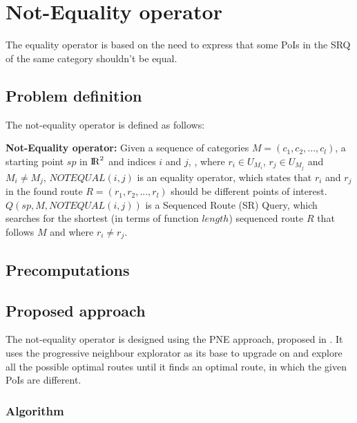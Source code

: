 \section{Not-Equality operator}
The equality operator is based on the need to express that some PoIs in the SRQ of the same category shouldn't be equal.

\subsection{Problem definition} 
\label{sec:problem}
The not-equality operator is defined as follows: \newline

\textbf{Not-Equality operator:} Given a sequence of categories $M = (c_1, c_2, ..., c_l)$, a starting point $sp$ in ${\rm I\!R}^2$ and indices $i$ and $j$, , where $r_i \in U_{M_{i}}$, $r_j \in U_{M_{j}}$ and $M_i \neq M_j$, $NOTEQUAL(i, j)$ is an equality operator, which states that $r_i$ and $r_j$ in the found route $R = (r_1, r_2, ..., r_l)$ should be different points of interest.
$Q(sp, M, NOTEQUAL(i, j))$ is a Sequenced Route (SR) Query, which searches for the shortest (in terms of function $length$) sequenced route $R$ that follows $M$ and where $r_i \neq r_j$.

\subsection{Precomputations} 
\label{sec:precomp}

\subsection{Proposed approach} 
\label{sec:approach}
The not-equality operator is designed using the PNE approach, proposed in \cite{OSR}. It uses the progressive neighbour explorator as its base to upgrade on and explore all the possible optimal routes until it finds an optimal route, in which the given PoIs are different.

\subsubsection{Algorithm}
\label{sec:algortihm}



